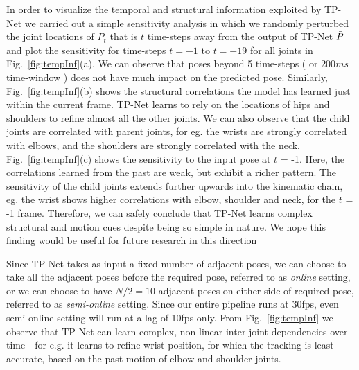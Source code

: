 \documentclass[runningheads]{llncs}
\begin{document}
In order to visualize the temporal and structural information exploited by TP-Net we carried out a simple sensitivity analysis in which we randomly perturbed the joint locations of $P_t$ that is $t$ time-steps away from the output of TP-Net $\Bar{P}$ and plot the sensitivity for time-steps $t=-1$ to $t=-19$ for all joints in Fig.~\ref{fig:tempInf}(a). We can observe that poses beyond 5 time-steps ( or $200ms$ time-window ) does not have much impact on the predicted pose. Similarly, Fig.~\ref{fig:tempInf}(b) shows the structural correlations the model has learned just within the current frame. TP-Net learns to rely on the locations of hips and shoulders to refine almost all the other joints. We can also observe that the child joints are correlated with parent joints, for eg. the wrists are strongly correlated with elbows, and the shoulders are strongly correlated with the neck. Fig.~\ref{fig:tempInf}(c) shows the sensitivity to the input pose at $t$ = -1. Here, the correlations learned from the past are weak, but exhibit a richer pattern. The sensitivity of the child joints extends further upwards into the kinematic chain, eg. the wrist shows higher correlations with elbow, shoulder and neck, for the $t$ = -1 frame. Therefore, we can safely conclude that TP-Net learns complex structural and motion cues despite being so simple in nature. We hope this finding would be useful for future research in this direction

Since TP-Net takes as input a fixed number of adjacent poses, we can choose to take all the adjacent poses before the required pose, referred to as \emph{online} setting, or we can choose to have $N/2=10$ adjacent poses on either side of required pose, referred to as \emph{semi-online} setting. Since our entire pipeline runs at 30fps, even semi-online setting will run at a lag of 10fps only. From Fig.~\ref{fig:tempInf} we observe that TP-Net can learn complex, non-linear inter-joint dependencies over time - for e.g. it learns to refine wrist position, for which the tracking is least accurate, based on the past motion of elbow and shoulder joints.
\end{document}
